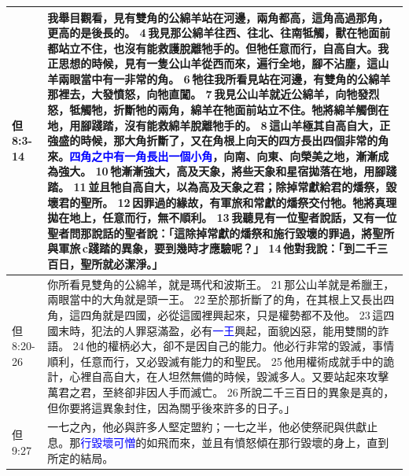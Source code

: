 \begin{table}[H]
\begin{tabular}{p{1.6cm}|p{15.25cm}}
但8:3-14&我舉目觀看，見有雙角的公綿羊站在河邊，兩角都高，這角高過那角，更高的是後長的。 4 我見那公綿羊往西、往北、往南牴觸，獸在牠面前都站立不住，也沒有能救護脫離牠手的。但牠任意而行，自高自大。我正思想的時候，見有一隻公山羊從西而來，遍行全地，腳不沾塵，這山羊兩眼當中有一非常的角。 6 牠往我所看見站在河邊，有雙角的公綿羊那裡去，大發憤怒，向牠直闖。 7 我見公山羊就近公綿羊，向牠發烈怒，牴觸牠，折斷牠的兩角，綿羊在牠面前站立不住。牠將綿羊觸倒在地，用腳踐踏，沒有能救綿羊脫離牠手的。 8 這山羊極其自高自大，正強盛的時候，那大角折斷了，又在角根上向天的四方長出四個非常的角來。\textcolor{blue}{四角之中有一角長出一個小角}，向南、向東、向榮美之地，漸漸成為強大。 10 牠漸漸強大，高及天象，將些天象和星宿拋落在地，用腳踐踏。 11 並且牠自高自大，以為高及天象之君；除掉常獻給君的燔祭，毀壞君的聖所。 12 因罪過的緣故，有軍旅和常獻的燔祭交付牠。牠將真理拋在地上，任意而行，無不順利。 13 我聽見有一位聖者說話，又有一位聖者問那說話的聖者說：「這除掉常獻的燔祭和施行毀壞的罪過，將聖所與軍旅 c踐踏的異象，要到幾時才應驗呢？」 14 他對我說：「到二千三百日，聖所就必潔淨。」\\\hline

但8:20-26&你所看見雙角的公綿羊，就是瑪代和波斯王。 21 那公山羊就是希臘王，兩眼當中的大角就是頭一王。 22 至於那折斷了的角，在其根上又長出四角，這四角就是四國，必從這國裡興起來，只是權勢都不及他。 23 這四國末時，犯法的人罪惡滿盈，必有\textcolor{blue}{一王}興起，面貌凶惡，能用雙關的詐語。 24 他的權柄必大，卻不是因自己的能力。他必行非常的毀滅，事情順利，任意而行，又必毀滅有能力的和聖民。 25 他用權術成就手中的詭計，心裡自高自大，在人坦然無備的時候，毀滅多人。又要站起來攻擊萬君之君，至終卻非因人手而滅亡。 26 所說二千三百日的異象是真的，但你要將這異象封住，因為關乎後來許多的日子。」\\\hline



  但9:27&一七之內，他必與許多人堅定盟約；一七之半，他必使祭祀與供獻止息。那\textcolor{blue}{行毀壞可憎}的如飛而來，並且有憤怒傾在那行毀壞的身上，直到所定的結局。\\\hline


\end{tabular}
\end{table}
